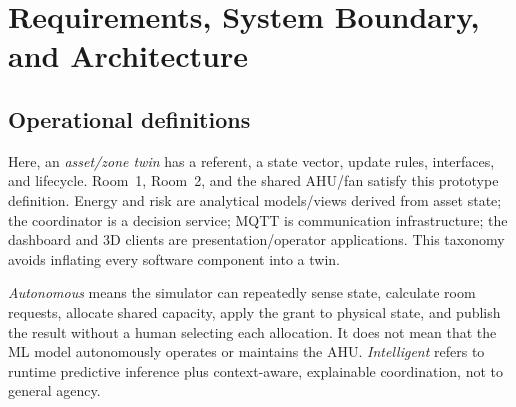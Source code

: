 \chapter{Requirements, System Boundary, and Architecture}
\label{ch:architecture}

\section{Operational definitions}
Here, an \emph{asset/zone twin} has a referent, a state vector, update rules, interfaces, and lifecycle. Room~1, Room~2, and the shared AHU/fan satisfy this prototype definition. Energy and risk are analytical models/views derived from asset state; the coordinator is a decision service; MQTT is communication infrastructure; the dashboard and 3D clients are presentation/operator applications. This taxonomy avoids inflating every software component into a twin.

\emph{Autonomous} means the simulator can repeatedly sense state, calculate room requests, allocate shared capacity, apply the grant to physical state, and publish the result without a human selecting each allocation. It does not mean that the ML model autonomously operates or maintains the AHU. \emph{Intelligent} refers to runtime predictive inference plus context-aware, explainable coordination, not to general agency.

